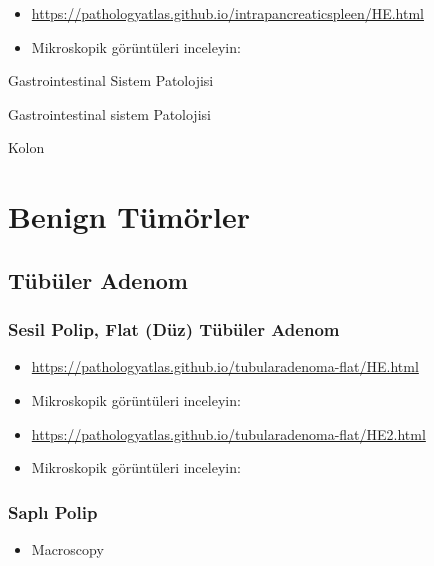 \documentclass[
  letterpaper,
  DIV=11,
  numbers=noendperiod]{scrreprt}
\providecommand{\tightlist}{%
  \setlength{\itemsep}{0pt}\setlength{\parskip}{0pt}}
\begin{document}
\begin{itemize}
\item
  \url{https://pathologyatlas.github.io/intrapancreaticspleen/HE.html}
\item
  Mikroskopik görüntüleri inceleyin:
\end{itemize}

Gastrointestinal Sistem Patolojisi

Gastrointestinal sistem Patolojisi

Kolon

\hypertarget{benign-tuxfcmuxf6rler-1}{%
\chapter{Benign Tümörler}\label{benign-tuxfcmuxf6rler-1}}

\hypertarget{tuxfcbuxfcler-adenom-1}{%
\section{Tübüler Adenom}\label{tuxfcbuxfcler-adenom-1}}

\hypertarget{sesil-polip-flat-duxfcz-tuxfcbuxfcler-adenom-1}{%
\subsection{Sesil Polip, Flat (Düz) Tübüler
Adenom}\label{sesil-polip-flat-duxfcz-tuxfcbuxfcler-adenom-1}}

\begin{itemize}
\item
  \url{https://pathologyatlas.github.io/tubularadenoma-flat/HE.html}
\item
  Mikroskopik görüntüleri inceleyin:
\end{itemize}

\begin{itemize}
\item
  \url{https://pathologyatlas.github.io/tubularadenoma-flat/HE2.html}
\item
  Mikroskopik görüntüleri inceleyin:
\end{itemize}

\hypertarget{saplux131-polip-1}{%
\subsection{Saplı Polip}\label{saplux131-polip-1}}

\begin{itemize}
\tightlist
\item
  Macroscopy
\end{itemize}
\end{document}
